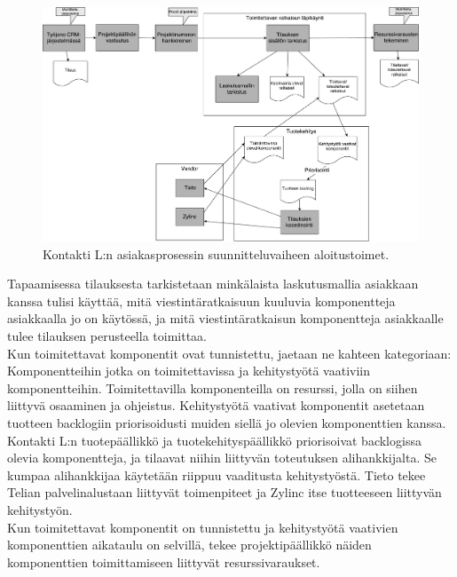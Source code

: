 \documentclass[finnish,12pt,a4paper,pdftex]{article}
\begin{document}
\begin{figure}[!h]
    \centering
    \includegraphics[scale=0.3]{images/aloitus.pdf}
    \caption{Kontakti L:n asiakasprosessin suunnitteluvaiheen aloitustoimet.}
    \label{fig:aloitustoimet}
\end{figure}

Tapaamisessa tilauksesta tarkistetaan minkälaista laskutusmallia asiakkaan kanssa tulisi käyttää, mitä viestintäratkaisuun kuuluvia komponentteja asiakkaalla jo on käytössä, ja mitä viestintäratkaisun komponentteja asiakkaalle tulee tilauksen perusteella toimittaa.\\

Kun toimitettavat komponentit ovat tunnistettu, jaetaan ne kahteen kategoriaan: Komponentteihin jotka on toimitettavissa ja kehitystyötä vaativiin komponentteihin. Toimitettavilla komponenteilla on resurssi, jolla on siihen liittyvä osaaminen ja ohjeistus. Kehitystyötä vaativat komponentit asetetaan tuotteen backlogiin priorisoidusti muiden siellä jo olevien komponenttien kanssa.\\

Kontakti L:n tuotepäällikkö ja tuotekehityspäällikkö priorisoivat backlogissa olevia komponentteja, ja tilaavat niihin liittyvän toteutuksen alihankkijalta. Se kumpaa alihankkijaa käytetään riippuu vaaditusta kehitystyöstä. Tieto tekee Telian palvelinalustaan liittyvät toimenpiteet ja Zylinc itse tuotteeseen liittyvän kehitystyön.\\

Kun toimitettavat komponentit on tunnistettu ja kehitystyötä vaativien komponenttien aikataulu on selvillä, tekee projektipäällikkö näiden komponenttien toimittamiseen liittyvät resurssivaraukset.\\
\end{document}
